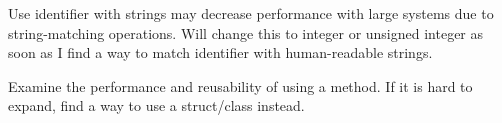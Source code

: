 
\begin{DoxyRefList}
\item[\label{todo__todo000001}%
\hypertarget{todo__todo000001}{}%
Member \hyperlink{classDatabase_1_1DataNode_ace59a7fba9c490d2dae59c4af7b0c71f}{Database\+:\+:Data\+Node\+:\+:identifier} ]Use identifier with strings may decrease performance with large systems due to string-\/matching operations. Will change this to integer or unsigned integer as soon as I find a way to match identifier with human-\/readable strings.  
\item[\label{todo__todo000002}%
\hypertarget{todo__todo000002}{}%
Member \hyperlink{classRules_1_1Rule_a6fe9b4fa6aaface7ba7f2400d2b27dbc}{Rules\+:\+:Rule\+:\+:action} ()=0]Examine the performance and reusability of using a method. If it is hard to expand, find a way to use a struct/class instead. 
\end{DoxyRefList}
